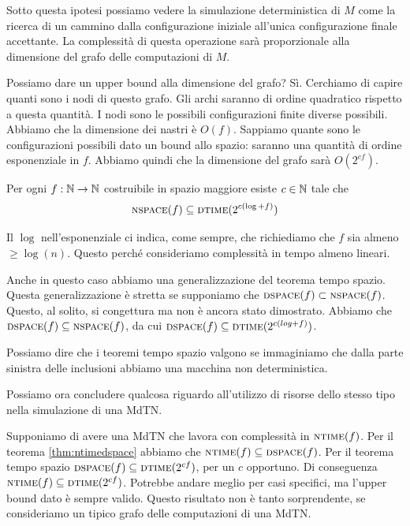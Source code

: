 Sotto questa ipotesi possiamo vedere la simulazione deterministica di $M$ come la ricerca di un
cammino dalla configurazione iniziale all'unica configurazione finale accettante. La complessità di
questa operazione sarà proporzionale alla dimensione del grafo delle computazioni di $M$.

Possiamo dare un upper bound alla dimensione del grafo? Sì. Cerchiamo di capire quanti sono i nodi
di questo grafo. Gli archi saranno di ordine quadratico rispetto a questa quantità. I nodi sono le
possibili configurazioni finite diverse possibili. Abbiamo che la dimensione dei nastri è $O(f)$.
Sappiamo quante sono le configurazioni possibili dato un bound allo spazio: saranno una quantità di
ordine esponenziale in $f$. Abbiamo quindi che la dimensione del grafo sarà $O(2^{cf})$.

\begin{thm}\label{thm:nspacedtime}
    Per ogni $f:\mathbb{N} \to \mathbb{N}$ costruibile in spazio maggiore esiste $c \in \mathbb{N}$ tale che
    \begin{equation*}
        \textsc{nspace}(f) \subseteq \textsc{dtime}(2^{c(\log + f)})
    \end{equation*}
\end{thm}

Il $\log$ nell'esponenziale ci indica, come sempre, che richiediamo che $f$ sia almeno $\geq
\log(n)$. Questo perché consideriamo complessità in tempo almeno lineari.

Anche in questo caso abbiamo una generalizzazione del teorema tempo spazio. Questa generalizzazione
è stretta se supponiamo che $\textsc{dspace}(f) \subset \textsc{nspace}(f)$. Questo, al solito, si congettura ma
non è ancora stato dimostrato. Abbiamo che $\textsc{dspace}(f) \subseteq \textsc{nspace}(f)$, da cui $\textsc{dspace}(f)
\subseteq \textsc{dtime}(2^{c(log + f)})$.

Possiamo dire che i teoremi tempo spazio valgono se immaginiamo che dalla parte sinistra delle
inclusioni abbiamo una macchina non deterministica.

Possiamo ora concludere qualcosa riguardo all'utilizzo di risorse dello stesso tipo nella
simulazione di una MdTN.

Supponiamo di avere una MdTN che lavora con complessità in $\textsc{ntime}(f)$. Per il teorema
\ref{thm:ntimedspace} abbiamo che $\textsc{ntime}(f) \subseteq \textsc{dspace}(f)$. Per il teorema tempo spazio
$\textsc{dspace}(f) \subseteq \textsc{dtime}(2^{cf})$, per un $c$ opportuno. Di conseguenza $\textsc{ntime}(f) \subseteq
\textsc{dtime}(2^{cf})$. Potrebbe andare meglio per casi specifici, ma l'upper bound dato è sempre valido.
Questo risultato non è tanto sorprendente, se consideriamo un tipico grafo delle computazioni di
una MdTN.

